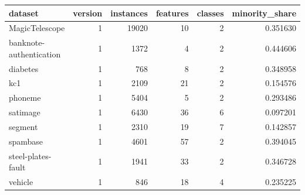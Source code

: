 \begin{tabular}{lrrrrr}
\toprule
dataset & version & instances & features & classes & minority_share \\
\midrule
MagicTelescope & 1 & 19020 & 10 & 2 & 0.351630 \\
banknote-authentication & 1 & 1372 & 4 & 2 & 0.444606 \\
diabetes & 1 & 768 & 8 & 2 & 0.348958 \\
kc1 & 1 & 2109 & 21 & 2 & 0.154576 \\
phoneme & 1 & 5404 & 5 & 2 & 0.293486 \\
satimage & 1 & 6430 & 36 & 6 & 0.097201 \\
segment & 1 & 2310 & 19 & 7 & 0.142857 \\
spambase & 1 & 4601 & 57 & 2 & 0.394045 \\
steel-plates-fault & 1 & 1941 & 33 & 2 & 0.346728 \\
vehicle & 1 & 846 & 18 & 4 & 0.235225 \\
\bottomrule
\end{tabular}

